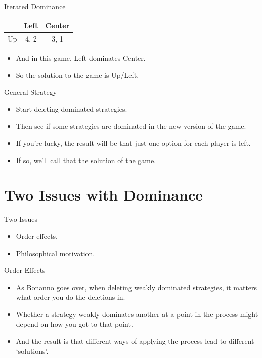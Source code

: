 \documentclass[
  14pt,
  letterpaper,
  ignorenonframetext,
  aspectratio=169,
  handout]{beamer}
\providecommand{\tightlist}{%
  \setlength{\itemsep}{0pt}\setlength{\parskip}{0pt}}\usepackage{longtable,booktabs,array}
\let\olditem\item
\renewcommand{\item}{%
\olditem\vspace{6pt}}
\begin{document}
\begin{frame}{Iterated Dominance}
\protect\hypertarget{iterated-dominance-5}{}
\begin{table}[!h]
\centering
\begin{tabular}[t]{>{}r|cc}
\toprule
 & Left & Center\\
\midrule
Up & 4, 2 & 3, 1\\
\bottomrule
\end{tabular}
\end{table}

\begin{itemize}[<+->]
\tightlist
\item
  And in this game, Left dominates Center.
\item
  So the solution to the game is Up/Left.
\end{itemize}
\end{frame}

\begin{frame}{General Strategy}
\protect\hypertarget{general-strategy}{}
\begin{itemize}[<+->]
\tightlist
\item
  Start deleting dominated strategies.
\item
  Then see if some strategies are dominated in the new version of the
  game.
\item
  If you're lucky, the result will be that just one option for each
  player is left.
\item
  If so, we'll call that the solution of the game.
\end{itemize}
\end{frame}

\hypertarget{two-issues-with-dominance}{%
\section{Two Issues with Dominance}\label{two-issues-with-dominance}}

\begin{frame}{Two Issues}
\protect\hypertarget{two-issues}{}
\begin{itemize}[<+->]
\tightlist
\item
  Order effects.
\item
  Philosophical motivation.
\end{itemize}
\end{frame}

\begin{frame}{Order Effects}
\protect\hypertarget{order-effects}{}
\begin{itemize}[<+->]
\tightlist
\item
  As Bonanno goes over, when deleting weakly dominated strategies, it
  matters what order you do the deletions in.
\item
  Whether a strategy weakly dominates another at a point in the process
  might depend on how you got to that point.
\item
  And the result is that different ways of applying the process lead to
  different `solutions'.
\end{itemize}
\end{frame}
\end{document}
